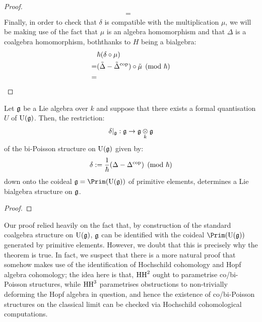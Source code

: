 \begin{proof}
$$\begin{aligned}
                            = & 
                        \end{aligned}
                    $$
                Finally, in order to check that $\delta$ is compatible with the multiplication $\mu$, we will be making use of the fact that $\mu$ is an algebra homomorphism and that $\Delta$ is a coalgebra homomorphism, boththanks to $H$ being a bialgebra:
                    $$
                        \begin{aligned}
                            & \hbar( \delta \circ \mu )
                            \\
                            = & (\tilde{\Delta} - \tilde{\Delta}^{\mathrm{cop}}) \circ \tilde{\mu} \pmod{\hbar}
                            \\
                            = & 
                        \end{aligned}
                    $$
            \end{proof}
        \begin{theorem} \label{theorem: lie_bialgebra_structures_from_bi_poisson_structures}
            Let $\mathfrak{g}$ be a Lie algebra over $k$ and suppose that there exists a formal quantisation $U$ of $\mathrm{U}(\mathfrak{g})$. Then, the restriction:
                $$\delta|_{\g}: \g \to \g \tensor_k \g$$
            of the bi-Poisson structure on $\mathrm{U}(\mathfrak{g})$ given by:
                $$\delta := \frac{1}{\hbar}(\Delta - \Delta^{\mathrm{cop}}) \pmod{\hbar}$$
            down onto the coideal $\g = \Prim(\rmU(\g))$ of primitive elements, determines a Lie bialgebra structure on $\mathfrak{g}$.    
        \end{theorem}
            \begin{proof}
                
            \end{proof}
        \begin{remark}
            Our proof relied heavily on the fact that, by construction of the standard coalgebra structure on $\mathrm{U}(\mathfrak{g})$, $\mathfrak{g}$ can be identified with the coideal $\Prim(\rmU(\g))$ generated by primitive elements. However, we doubt that this is precisely why the theorem is true. In fact, we suspect that there is a more natural proof that somehow makes use of the identification of Hochschild cohomology and Hopf algebra cohomology; the idea here is that, $\mathrm{HH}^2$ ought to parametrise co/bi-Poisson structures, while $\mathrm{HH}^3$ parametrises obstructions to non-trivially deforming the Hopf algebra in question, and hence the existence of co/bi-Poisson structures on the classical limit can be checked via Hochschild cohomological computations. 
        \end{remark}
    
